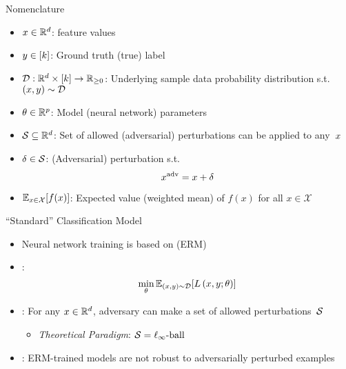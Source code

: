 \begin{frame}{Nomenclature}
    

  \begin{itemize}[<+->]
    \setlength{\itemsep}{6pt}
    \item ${x \in \mathbb{R}^{d}}$: feature values
    \item ${y \in {\lbrack k\rbrack}}$: Ground truth (true) label
    \item ${\mathcal{D}:\mathbb{R}^{d} \times {\lbrack k\rbrack}\rightarrow\mathbb{R}_{{\geq}0}}$: Underlying sample data probability distribution s.t.\ ${(x,y) \sim \mathcal{D}}$

    \vspace{6pt}
    \item ${\theta \in \mathbb{R}^{p}}$: Model (neural network) parameters

    \vspace{6pt}
    \item ${\mathcal{S} \subseteq \mathbb{R}^{d}}$: Set of allowed (adversarial) perturbations can be applied to any~$x$
    \item ${\delta \in \mathcal{S}}$: (Adversarial) perturbation s.t.
      \begin{equation}\label{eq:AdversarialX}
        x^{\text{adv}} = x + \delta
      \end{equation}

    \vspace{6pt}
    \item $\mathbb{E}_{x \in \mathcal{X}}\lbrack f(x)\rbrack$: Expected value (weighted mean) of $f(x)$ for all ${x \in \mathcal{X}}$
  \end{itemize}
\end{frame}


\begin{frame}{``Standard'' Classification Model}
  \begin{itemize}[<+->]
    \setlength{\itemsep}{20pt}
    \item Neural network training is based on \textit{} (ERM)
    \item \textbf{}:
      \begin{equation}\label{eq:ERM}
        \min_{\theta} \mathbb{E}_{(x,y) \sim \mathcal{D}} \lbrack L \left( x, y ; \theta \right)\rbrack
      \end{equation}

    \item \textit{}: For any ${x \in \mathbb{R}^{d}}$, adversary can make a set of allowed perturbations~$\mathcal{S}$
      \begin{itemize}
        \item \textit{Theoretical Paradigm}: $\mathcal{S} = \ell_{\infty}\text{-ball}$
      \end{itemize}

    \item \textbf{}: ERM-trained models are not robust to adversarially perturbed examples~\cite{Biggio:2013,Szegedy:2013}
  \end{itemize}
\end{frame}


